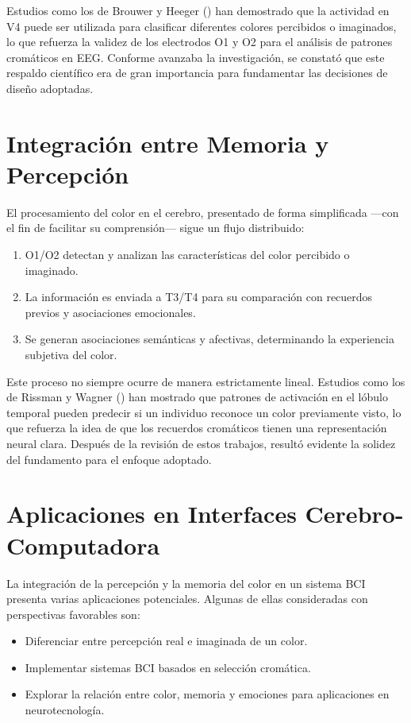Estudios como los de Brouwer y Heeger (\citeyear{Brouwer_Heeger_2013}) han demostrado que la actividad en V4 puede ser utilizada para clasificar diferentes colores percibidos o imaginados, lo que refuerza la validez de los electrodos O1 y O2 para el análisis de patrones cromáticos en EEG. Conforme avanzaba la investigación, se constató que este respaldo científico era de gran importancia para fundamentar las decisiones de diseño adoptadas.

\newpage

\section{Integración entre Memoria y Percepción}
El procesamiento del color en el cerebro, presentado de forma simplificada —con el fin de facilitar su comprensión— sigue un flujo distribuido:
\begin{enumerate}
    \item O1/O2 detectan y analizan las características del color percibido o imaginado.
    \item La información es enviada a T3/T4 para su comparación con recuerdos previos y asociaciones emocionales.
    \item Se generan asociaciones semánticas y afectivas, determinando la experiencia subjetiva del color.
\end{enumerate}

Este proceso no siempre ocurre de manera estrictamente lineal. Estudios como los de Rissman y Wagner (\citeyear{Rissman_Wagner_2012}) han mostrado que patrones de activación en el lóbulo temporal pueden predecir si un individuo reconoce un color previamente visto, lo que refuerza la idea de que los recuerdos cromáticos tienen una representación neural clara. Después de la revisión de estos trabajos, resultó evidente la solidez del fundamento para el enfoque adoptado.

\section{Aplicaciones en Interfaces Cerebro-Computadora}

La integración de la percepción y la memoria del color en un sistema BCI presenta varias aplicaciones potenciales. Algunas de ellas consideradas con perspectivas favorables son:

\begin{itemize}
    \item Diferenciar entre percepción real e imaginada de un color.
    \item Implementar sistemas BCI basados en selección cromática.
    \item Explorar la relación entre color, memoria y emociones para aplicaciones en neurotecnología.
\end{itemize}

